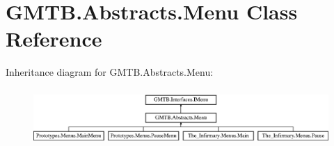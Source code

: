 \hypertarget{class_g_m_t_b_1_1_abstracts_1_1_menu}{}\section{G\+M\+T\+B.\+Abstracts.\+Menu Class Reference}
\label{class_g_m_t_b_1_1_abstracts_1_1_menu}
Inheritance diagram for G\+M\+T\+B.\+Abstracts.\+Menu\+:\begin{figure}[H]
\begin{center}
\leavevmode
\includegraphics[height=2.176166cm]{class_g_m_t_b_1_1_abstracts_1_1_menu}
\end{center}
\end{figure}
